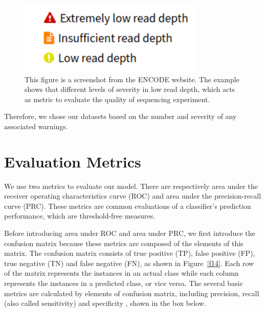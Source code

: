 \begin{figure}[H]
    \centering
    \includegraphics[width=0.5\columnwidth]{body/figure/figure13.png}
    \captionsetup{labelfont=bf}
    \renewcommand{\baselinestretch}{1.0}
    \caption[Example of warning levels]{This figure is a screenshot from the ENCODE website. The example shows that different levels of severity in low read depth, which acts as metric to evaluate the quality of sequencing experiment.}
    \label{f13}
\end{figure}

Therefore, we chose our datasets based on the number and severity of any associated warnings.

\section{Evaluation Metrics} \label{metric}
We use two metrics to evaluate our model. There are respectively area under the receiver operating characteristics curve (ROC) and area under the precision-recall curve (PRC). These metrics are common evaluations of a classifier’s prediction performance, which are threshold-free measures.

Before introducing area under ROC and area under PRC, we first introduce the confusion matrix because these metrics are composed of the elements of this matrix. The confusion matrix consists of true positive (TP), false positive (FP), true negative (TN) and false negative (FN), as shown in Figure~\ref{f14}. Each row of the matrix represents the instances in an actual class while each column represents the instances in a predicted class, or vice versa. The several basic metrics are calculated by elements of confusion matrix, including precision, recall (also called sensitivity) and specificity \cite{saito2015precision}, shown in the box below.

\begin{center}
\end{center}




